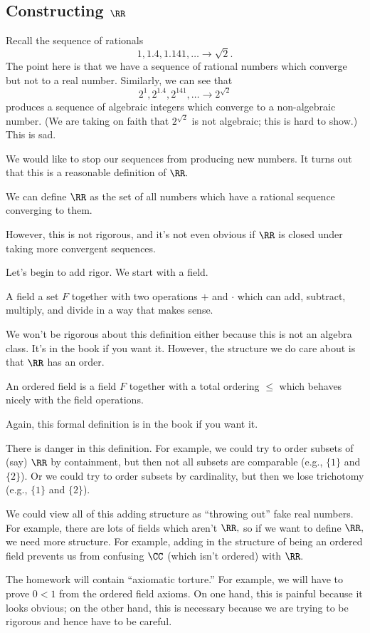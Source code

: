 








\subsection{Constructing \texorpdfstring{$\RR$}{}}
Recall the sequence of rationals
\[1,1.4,1.141,\ldots\to\sqrt2.\]
The point here is that we have a sequence of rational numbers which converge but not to a real number. Similarly, we can see that
\[2^1,2^{1.4},2^{141},\ldots\to2^{\sqrt2}\]
produces a sequence of algebraic integers which converge to a non-algebraic number. (We are taking on faith that $2^{\sqrt2}$ is not algebraic; this is hard to show.) This is sad.

We would like to stop our sequences from producing new numbers. It turns out that this is a reasonable definition of $\RR.$
\begin{defi}[Reals, I] \label{defi:real1}
	We can define $\RR$ as the set of all numbers which have a rational sequence converging to them.
\end{defi}
However, this is not rigorous, and it's not even obvious if $\RR$ is closed under taking more convergent sequences.

Let's begin to add rigor. We start with a field.
\begin{defi}[Field]
	A field a set $F$ together with two operations $+$ and $\cdot$ which can add, subtract, multiply, and divide in a way that makes sense.
\end{defi}
We won't be rigorous about this definition either because this is not an algebra class. It's in the book if you want it. However, the structure we do care about is that $\RR$ has an order.
\begin{defi}
	An ordered field is a field $F$ together with a total ordering $\le$ which behaves nicely with the field operations.
\end{defi}
Again, this formal definition is in the book if you want it.
\begin{warn}
	There is danger in this definition. For example, we could try to order subsets of (say) $\RR$ by containment, but then not all subsets are comparable (e.g., $\{1\}$ and $\{2\}$). Or we could try to order subsets by cardinality, but then we lose trichotomy (e.g., $\{1\}$ and $\{2\}$).
\end{warn}
\begin{remark}
	We could view all of this adding structure as ``throwing out'' fake real numbers. For example, there are lots of fields which aren't $\RR,$ so if we want to define $\RR,$ we need more structure. For example, adding in the structure of being an ordered field prevents us from confusing $\CC$ (which isn't ordered) with $\RR.$
\end{remark}
\begin{remark}
	The homework will contain ``axiomatic torture.'' For example, we will have to prove $0<1$ from the ordered field axioms. On one hand, this is painful because it looks obvious; on the other hand, this is necessary because we are trying to be rigorous and hence have to be careful.
\end{remark}

